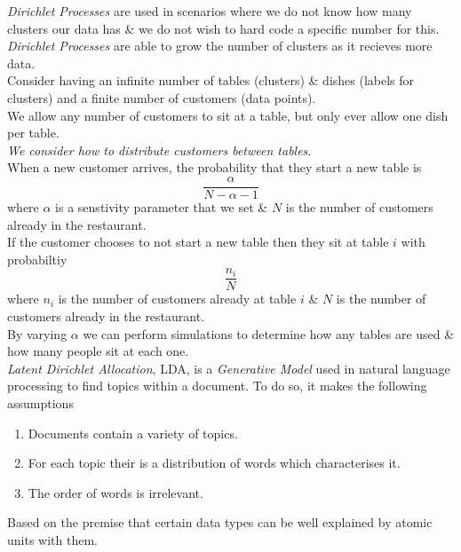 \documentclass[11pt,a4paper]{article}
\begin{document}

\textit{Dirichlet Processes} are used in scenarios where we do not know how many clusters our data has \& we do not wish to hard code a specific number for this. \textit{Dirichlet Processes} are able to grow the number of clusters as it recieves more data.\\

Consider having an infinite number of tables (clusters) \& dishes (labels for clusters) and a finite number of customers (data points).\\
We allow any number of customers to sit at a table, but only ever allow one dish per table.\\
\textit{We consider how to distribute customers between tables.}\\
When a new customer arrives, the probability that they start a new table is
$$\frac\alpha{N-\alpha-1}$$
where $\alpha$ is a senstivity parameter that we set \& $N$ is the number of customers already in the restaurant.\\
If the customer chooses to not start a new table then they sit at table $i$ with probabiltiy
$$\frac{n_i}N$$
where $n_i$ is the number of customers already at table $i$ \& $N$ is the number of customers already in the restaurant.\\
By varying $\alpha$ we can perform simulations to determine how any tables are used \& how many people sit at each one.\\

\textit{Latent Dirichlet Allocation}, LDA, is a \textit{Generative Model} used in natural language processing to find topics within a document. To do so, it makes the following assumptions
\begin{enumerate}
	\item Documents contain a variety of topics.
	\item For each topic their is a distribution of words which characterises it.
	\item The order of words is irrelevant.
\end{enumerate}
\nb Based on the premise that certain data types can be well explained by atomic units with them.\\
\end{document}
